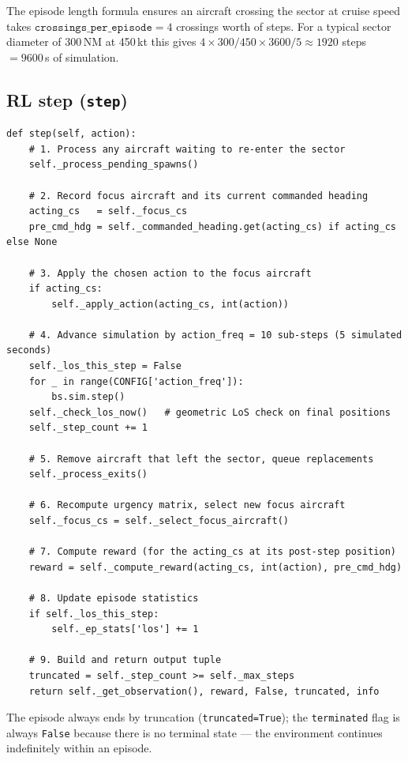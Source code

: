 \documentclass[11pt, a4paper]{article}
\begin{document}
The episode length formula ensures an aircraft crossing the sector at cruise speed
takes $\texttt{crossings\_per\_episode} = 4$ crossings worth of steps.
For a typical sector diameter of 300\,NM at 450\,kt this gives
$4 \times 300 / 450 \times 3600 / 5 \approx 1920$ steps $= 9600$\,s of simulation.

\subsection{RL step (\texttt{step})}

\begin{lstlisting}[caption={The \texttt{step()} method --- executed once per RL decision.}]
def step(self, action):
    # 1. Process any aircraft waiting to re-enter the sector
    self._process_pending_spawns()

    # 2. Record focus aircraft and its current commanded heading
    acting_cs   = self._focus_cs
    pre_cmd_hdg = self._commanded_heading.get(acting_cs) if acting_cs else None

    # 3. Apply the chosen action to the focus aircraft
    if acting_cs:
        self._apply_action(acting_cs, int(action))

    # 4. Advance simulation by action_freq = 10 sub-steps (5 simulated seconds)
    self._los_this_step = False
    for _ in range(CONFIG['action_freq']):
        bs.sim.step()
    self._check_los_now()   # geometric LoS check on final positions
    self._step_count += 1

    # 5. Remove aircraft that left the sector, queue replacements
    self._process_exits()

    # 6. Recompute urgency matrix, select new focus aircraft
    self._focus_cs = self._select_focus_aircraft()

    # 7. Compute reward (for the acting_cs at its post-step position)
    reward = self._compute_reward(acting_cs, int(action), pre_cmd_hdg)

    # 8. Update episode statistics
    if self._los_this_step:
        self._ep_stats['los'] += 1

    # 9. Build and return output tuple
    truncated = self._step_count >= self._max_steps
    return self._get_observation(), reward, False, truncated, info
\end{lstlisting}

The episode always ends by truncation (\texttt{truncated=True}); the
\texttt{terminated} flag is always \texttt{False} because there is no
terminal state --- the environment continues indefinitely within an episode.
\end{document}
